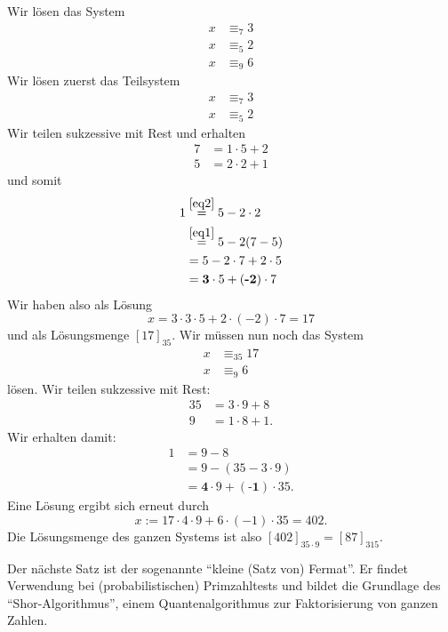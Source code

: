 \begin{bsp}
 Wir lösen das System
\begin{align*}
x&\equiv_{7} 3\\
x&\equiv_{5} 2\\
x&\equiv_{9} 6
\end{align*}
Wir lösen zuerst das Teilsystem
\begin{align*}
 x&\equiv_{7} 3\\
x&\equiv_{5} 2
\end{align*}
Wir teilen sukzessive mit Rest und erhalten
\begin{align}
 7&=1\cdot 5+2\label{eq1}\\
5&=2\cdot 2+1\label{eq2}
\end{align}
und somit
\begin{align*}
1&\stackrel{\ref{eq2}}{=}5-2\cdot 2\\
&\stackrel{\ref{eq1}}{=}5-2(7-5)\\
&=5-2\cdot7+2\cdot5\\
&=\textbf{3}\cdot 5+(\textbf{-2})\cdot 7
\end{align*}
Wir haben also als Lösung
\[
 x=3\cdot 3\cdot 5+2\cdot(-2)\cdot 7=17
\]
und als Lösungsmenge $[17]_{35}$. Wir müssen nun noch das System
\begin{align*}
x&\equiv_{35} 17\\
x&\equiv_{9} 6
\end{align*}
lösen. Wir teilen sukzessive mit Rest:
\begin{align*}
 35&=3\cdot 9+8\\
9&=1\cdot 8+1.
\end{align*}
Wir erhalten damit:
\begin{align*}
 1&=9-8\\
&=9-(35-3\cdot 9)\\
&=\textbf{4}\cdot 9+(\textbf{-1})\cdot 35.
\end{align*}
Eine Lösung ergibt sich erneut durch
\[
 x:=17\cdot4\cdot9+6\cdot(-1)\cdot35=402.
\]
Die Lösungsmenge des ganzen Systems ist also $[402]_{35\cdot9}=[87]_{315}$.
\end{bsp}

Der nächste Satz ist der sogenannte ``kleine (Satz von) Fermat''. Er findet Verwendung bei (probabilistischen) Primzahltests und bildet die Grundlage des ``Shor-Algorithmus'', einem Quantenalgorithmus zur Faktorisierung von ganzen Zahlen.

